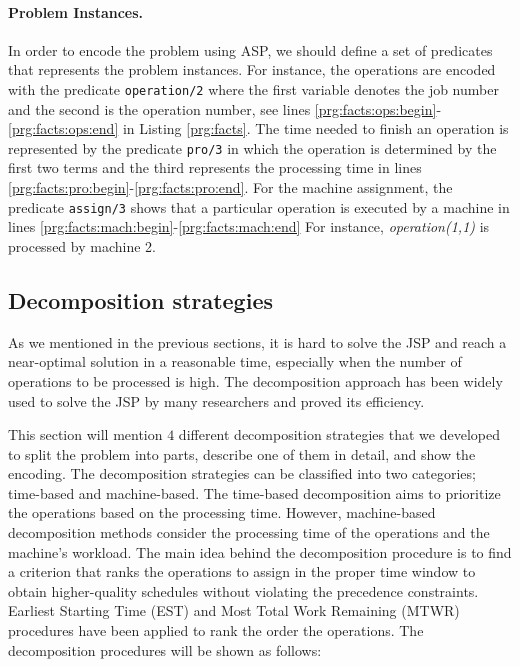 \documentclass{tlp} %
\begin{document}
\paragraph{Problem Instances.} 

In order to encode the problem using ASP, we should define a set of predicates that represents the problem instances. For instance, the operations are encoded with the predicate \lstinline{operation/2} where the first variable denotes the job number and the second is the operation number, see lines \ref{prg:facts:ops:begin}-\ref{prg:facts:ops:end} in Listing \ref{prg:facts}. The time needed to finish an operation is represented by the predicate \lstinline{pro/3} in which the operation is determined by the first two terms and the third represents the processing time in lines \ref{prg:facts:pro:begin}-\ref{prg:facts:pro:end}. For the machine assignment, the predicate \lstinline{assign/3} shows that a particular operation is executed by a machine in lines \ref{prg:facts:mach:begin}-\ref{prg:facts:mach:end} For instance, \emph{operation(1,1)} is processed by machine 2. 


\subsection{Decomposition strategies}
As we mentioned in the previous sections, it is hard to solve the JSP and reach a near-optimal solution in a reasonable time, especially when the number of operations to be processed is high. The decomposition approach has been widely used to solve the JSP by many researchers and proved its efficiency.

This section will mention $4$ different decomposition strategies that we developed to split the problem into parts, describe one of them in detail, and show the encoding. The decomposition strategies can be classified into two categories; time-based and machine-based. The time-based decomposition aims to prioritize the operations based on the processing time. However, machine-based decomposition methods consider the processing time of the operations and the machine's workload. The main idea behind the decomposition procedure is to find a criterion that ranks the operations to assign in the proper time window to obtain higher-quality schedules without violating the precedence constraints. Earliest Starting Time (EST) and Most Total Work Remaining (MTWR) procedures have been applied to rank the order the operations. The decomposition procedures will be shown as follows:
\end{document}
